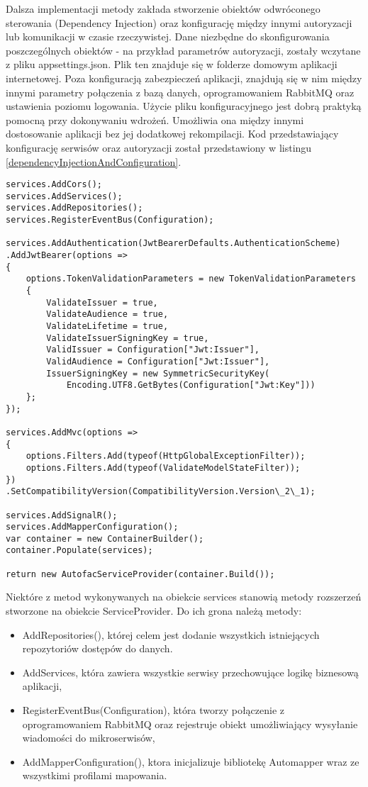 Dalsza implementacji metody zakłada stworzenie obiektów odwróconego sterowania (Dependency Injection) oraz konfigurację między innymi autoryzacji lub komunikacji w czasie rzeczywistej. Dane niezbędne do skonfigurowania poszczególnych obiektów - na przykład parametrów autoryzacji, zostały wczytane z pliku appsettings.json. Plik ten znajduje się w folderze domowym aplikacji internetowej. Poza konfiguracją zabezpieczeń aplikacji, znajdują się w nim między innymi parametry połączenia z bazą danych, oprogramowaniem RabbitMQ oraz ustawienia poziomu logowania. Użycie pliku konfiguracyjnego jest dobrą praktyką pomocną przy dokonywaniu wdrożeń. Umożliwia ona między innymi dostosowanie aplikacji bez jej dodatkowej rekompilacji. Kod przedstawiający konfigurację serwisów oraz autoryzacji został przedstawiony w listingu \ref{dependencyInjectionAndConfiguration}. 

\begin{lstlisting}[caption={Stworzenie obiektów odwróconego sterowania.},label={dependencyInjectionAndConfiguration} ]
services.AddCors();
services.AddServices();
services.AddRepositories();
services.RegisterEventBus(Configuration);

services.AddAuthentication(JwtBearerDefaults.AuthenticationScheme)
.AddJwtBearer(options =>
{
	options.TokenValidationParameters = new TokenValidationParameters
	{
		ValidateIssuer = true,
		ValidateAudience = true,
		ValidateLifetime = true,
		ValidateIssuerSigningKey = true,
		ValidIssuer = Configuration["Jwt:Issuer"],
		ValidAudience = Configuration["Jwt:Issuer"],
		IssuerSigningKey = new SymmetricSecurityKey(
			Encoding.UTF8.GetBytes(Configuration["Jwt:Key"]))
	};
});

services.AddMvc(options =>
{
	options.Filters.Add(typeof(HttpGlobalExceptionFilter));
	options.Filters.Add(typeof(ValidateModelStateFilter));
})
.SetCompatibilityVersion(CompatibilityVersion.Version\_2\_1);

services.AddSignalR();
services.AddMapperConfiguration();
var container = new ContainerBuilder();
container.Populate(services);

return new AutofacServiceProvider(container.Build());
\end{lstlisting}

Niektóre z metod wykonywanych na obiekcie services stanowią metody rozszerzeń stworzone na obiekcie ServiceProvider. Do ich grona należą metody:
\begin{itemize}[noitemsep]
	\item AddRepositories(), której celem jest dodanie wszystkich istniejących repozytoriów dostępów do danych.
	\item AddServices, która zawiera wszystkie serwisy przechowujące logikę biznesową aplikacji,
	\item RegisterEventBus(Configuration), która tworzy połączenie z oprogramowaniem RabbitMQ oraz rejestruje obiekt umożliwiający wysyłanie wiadomości do mikroserwisów,
	\item AddMapperConfiguration(), ktora inicjalizuje bibliotekę Automapper wraz ze wszystkimi profilami mapowania.
\end{itemize}


